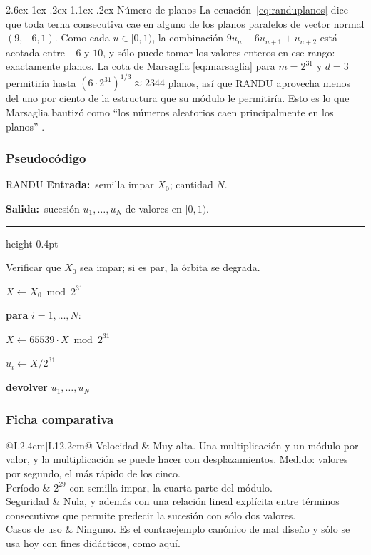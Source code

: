 \documentclass[11pt,letterpaper]{article}
\makeatletter
\renewcommand\paragraph{\@startsection{paragraph}{4}{\z@}%
  {2.6ex \@plus 1ex \@minus .2ex}%
  {1.1ex \@plus .2ex}%
  {\normalfont\normalsize\bfseries}}
\newcommand{\entrada}[1]{\textbf{\small Entrada:}\ \small #1\par}
\newcommand{\salida}[1]{\textbf{\small Salida:}\ \small #1\par
  \vspace{3pt}\textcolor{marco}{\hrule height 0.4pt}\vspace{5pt}}
\newcommand{\ficha}[6]{%
\begin{table}[htbp]\centering\small
\caption{#2}\label{#1}
\begin{tabular}{@{}L{2.4cm}|L{12.2cm}@{}}
\toprule
Velocidad    & #3 \\ \addlinespace
Período      & #4 \\ \addlinespace
Seguridad    & #5 \\ \addlinespace
Casos de uso & #6 \\
\bottomrule
\end{tabular}
\end{table}}
\makeatother
\begin{document}
\paragraph{Número de planos} La ecuación~\eqref{eq:randuplanos} dice que toda
terna consecutiva cae en alguno de los planos paralelos de vector normal
$(9,-6,1)$. Como cada $u \in [0,1)$, la combinación $9u_n - 6u_{n+1}+u_{n+2}$
está acotada entre $-6$ y $10$, y sólo puede tomar los valores enteros en ese
rango: exactamente \PlanosRandu{} planos. La cota de Marsaglia
\eqref{eq:marsaglia} para $m = 2^{31}$ y $d = 3$ permitiría hasta
$(6\cdot 2^{31})^{1/3} \approx 2344$ planos, así que RANDU aprovecha menos
del uno por ciento de la estructura que su módulo le permitiría. Esto es lo
que Marsaglia bautizó como ``los números aleatorios caen principalmente en
los planos'' \cite{marsaglia1968}.

\subsubsection{Pseudocódigo}

\begin{pseudo}{RANDU}
\entrada{semilla impar $X_0$; cantidad $N$.}
\salida{sucesión $u_1,\dots,u_N$ de valores en $[0,1)$.}
\begin{pasos}
  \item Verificar que $X_0$ sea impar; si es par, la órbita se degrada.
  \item $X \gets X_0 \bmod 2^{31}$
  \item \textbf{para} $i = 1, \dots, N$:
  \begin{pasos}
     \item $X \gets 65539 \cdot X \bmod 2^{31}$
     \item $u_i \gets X / 2^{31}$
  \end{pasos}
  \item \textbf{devolver} $u_1, \dots, u_N$
\end{pasos}
\end{pseudo}

\subsubsection{Ficha comparativa}

\ficha{tab:fichaRANDU}{Características de RANDU.}
{Muy alta. Una multiplicación y un módulo por valor, y la multiplicación se
puede hacer con desplazamientos. Medido: \velRANDU{} valores por segundo, el
más rápido de los cinco.}
{$2^{29}$ con semilla impar, la cuarta parte del módulo.}
{Nula, y además con una relación lineal explícita entre términos
consecutivos que permite predecir la sucesión con sólo dos valores.}
{Ninguno. Es el contraejemplo canónico de mal diseño y sólo se usa hoy con
fines didácticos, como aquí.}
\end{document}
